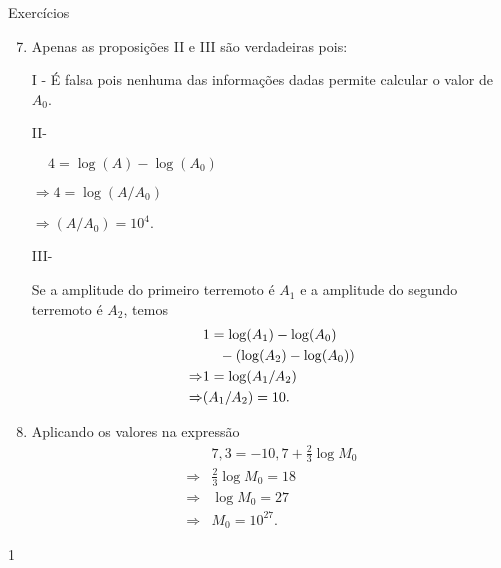 \begin{answer}{Exercícios}
{\exerciselist
\begin{enumerate}\setcounter{enumi}{6}
\item Apenas as proposições II e III são verdadeiras pois:

I - É falsa pois nenhuma das informações dadas permite calcular o valor de $A_0$.

II- \hspace{30mm}\begin{minipage}[t]{0.8\linewidth}
$\,\,\,\,\,\,\,4 = \log (A) - \log (A_0)$

$\Rightarrow 4 = \log (A/A_0)$

$\Rightarrow (A/A_0) = 10^4.$
\end{minipage}

III- \begin{minipage}[t]{0.8\linewidth}
Se a amplitude do primeiro terremoto é $A_1$ e a amplitude do segundo terremoto é $A_2$, temos
\begin{align*}
&1 = \log (A_1) - \log (A_0)\\
& \hspace{4mm}- (\log (A_2) - \log (A_0))\\
\Rightarrow &1 = \log (A_1/A_2)\\
\Rightarrow &(A_1/A_2) = 10.
\end{align*}
\end{minipage}

\item Aplicando os valores na expressão
\begin{align*}
&7{,}3 = -10{,}7+\frac{2}{3} \log M_0\\
\Rightarrow & \frac{2}{3} \log M_0 = 18\\
\Rightarrow & \log M_0 = 27\\
\Rightarrow & M_0 = 10^{27}.
\end{align*}
\end{enumerate}
}{1}
\end{answer}
\clearmargin
